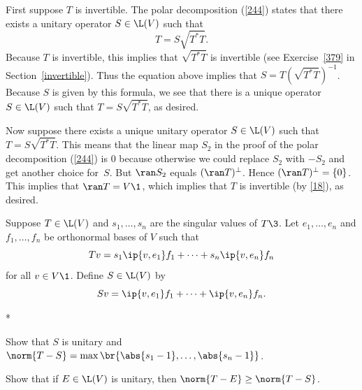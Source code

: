 \begin{Solution}
First suppose $T$ is invertible.  The polar decomposition (\ref{244}) states
that there exists a unitary operator $S \in \L(V)$ such that
\[
T = S \sqrt{T^* T}.
\]
Because $T$ is invertible, this implies that $\sqrt{T^* T}$ is invertible (see
Exercise~\ref{379} in Section~\ref{invertible}).  Thus the equation above implies that
$S = T {(\sqrt{T^* T})}^{-1}$.  Because $S$ is given by this formula, we see
that there is a unique operator $S \in \L(V)$ such that $T = S \sqrt{T^* T}$, as
desired.

Now suppose there exists a unique unitary operator $S \in \L(V)$ such that
$T = S \sqrt{T^* T}$.  This means that the linear map $S_2$ in the proof of the
polar decomposition (\ref{244}) is $0$ because otherwise we could
replace $S_2$ with $-S_2$ and get another choice for~$S$.  But $\ran S_2$ equals
$(\ran T)^\perp$. Hence $(\ran T)^\perp = \{0\}$.  This implies that
$\ran T = V\1$, which implies that $T$ is invertible (by \ref{18}), as desired.
\end{Solution}

\pagebreak[3]

\exercise
Suppose $T \in \L(V)$ and $s_1, \ldots, s_n$ are the singular values of $T\3$. Let $e_1, \ldots, e_n$ and $f_1, \ldots, f_n$ be orthonormal bases of $V$ such that \label{7unitary}
\[
Tv = s_1\ip{v, e_1} f_1 + \cdots + s_n \ip{v, e_n} f_n
\]
for all $v \in V\1$. Define $S \in \L(V)$ by
\[
Sv = \ip{v, e_1} f_1 + \cdots + \ip{v, e_n} f_n.
\]
\begin{subtheorem}*
\item
Show that $S$ is unitary and $\norm{T-S} = \max \br{ \abs{s_1 -1}, \ldots, \abs{s_n - 1} }$.
\item
Show that if $E \in \L(V)$ is unitary, then $\norm{T-E} \ge \norm{T-S}$.
\end{subtheorem}


